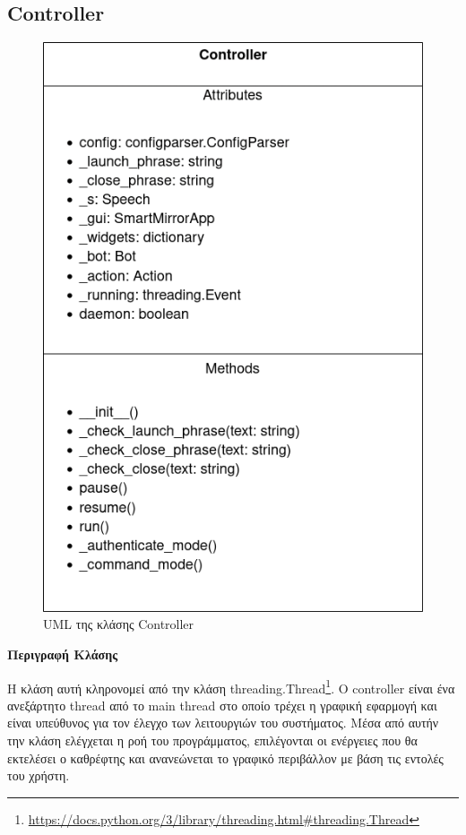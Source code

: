 \subsection{Controller}
\begin{figure}[h!]
    \centering
    \includegraphics[scale=0.7]{images/chapter4/uml_diagrams/Controller.png}
    \caption{UML της κλάσης Controller}
    \label{fig:controller}
\end{figure}
\newpage
\noindent\textbf{Περιγραφή Κλάσης}

Η κλάση αυτή κληρονομεί από την κλάση threading.Thread\footnote{\href{https://docs.python.org/3/library/threading.html\#threading.Thread}{https://docs.python.org/3/library/threading.html\#threading.Thread}}. O controller είναι ένα ανεξάρτητο thread από το main thread στο οποίο τρέχει η γραφική εφαρμογή και είναι υπεύθυνος για τον έλεγχο των λειτουργιών του συστήματος. Μέσα από αυτήν την κλάση ελέγχεται η ροή του προγράμματος, επιλέγονται οι ενέργειες που θα εκτελέσει ο καθρέφτης και ανανεώνεται το γραφικό περιβάλλον με βάση τις εντολές του χρήστη.


